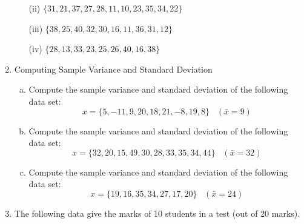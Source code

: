 \documentclass[a4paper,12pt]{article}
\begin{document}
\begin{enumerate}
\begin{itemize}
		
		
		\item[(ii)]	$\{31, 21, 37, 27, 28, 11, 10, 23, 35, 34, 22\}$ \smallskip
		
		
		
		
		
		\item[(iii)] 	$\{38, 25, 40, 32, 30, 16, 11, 36, 31, 12\}$ \smallskip
		
		
		\item[(iv)] 	$\{28, 13, 33, 23, 25, 26, 40, 16, 38\}$ \smallskip
		
		
	\end{itemize}
	
	
\item Computing Sample Variance and Standard Deviation
	
	\begin{enumerate}[(a)]
		
		\item Compute the sample variance and standard deviation of the following data set:
		\[x =\{5, -11, 9, 20, 18, 21, -8, 19, 8\}\; \; \; ( \bar{x} = 9) \]
		
		\item Compute the sample variance and standard deviation of the following data set:
		\[x =\{32, 20, 15, 49, 30, 28, 33, 35, 34, 44\}
		\; \; \; ( \bar{x} = 32) \]
		
		
		\item Compute the sample variance and standard deviation of the following data set:
		\[
		x =\{19, 16, 35, 34, 27, 17, 20\} \; \; \; ( \bar{x} = 24) \]
		
		
	\end{enumerate}
\newpage	
	\item The following data give the marks of 10 students in a test (out of 20 marks). 
	

\end{enumerate}
\end{document}
